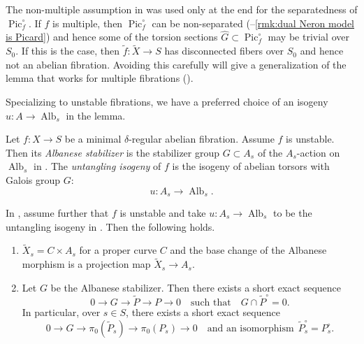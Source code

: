 \documentclass[reqno, letterpaper]{amsart}
\numberwithin{equation}{subsection}
\let\to\longrightarrow
\DeclareMathOperator{\Pic}{Pic}
\DeclareMathOperator{\Alb}{Alb}
\begin{document}
		\begin{remark} \label{rmk:untangle primitive}
			The non-multiple assumption in  was used only at the end for the separatedness of $\Pic^\circ_f$. If $f$ is multiple, then $\Pic^\circ_f$ can be non-separated (--\ref{rmk:dual Neron model is Picard}) and hence some of the torsion sections $\hat G \subset \Pic^\circ_f$ may be trivial over $S_0$. If this is the case, then $\tilde f : \tilde X \to S$ has disconnected fibers over $S_0$ and hence not an abelian fibration. Avoiding this carefully will give a generalization of the lemma that works for multiple fibrations ().
		\end{remark}
		
		Specializing to unstable fibrations, we have a preferred choice of an isogeny $u : A \to \Alb_s$ in the lemma.
		
		\begin{definition} \label{def:Albanese stabilizer}
			Let $f : X \to S$ be a minimal $\delta$-regular abelian fibration. Assume $f$ is unstable. Then its \emph{Albanese stabilizer} is the stabilizer group $G \subset A_s$ of the $A_s$-action on $\Alb_s$ in . The \emph{untangling isogeny} of $f$ is the isogeny of abelian torsors with Galois group $G$:
			\[ u : A_s \to \Alb_s .\]
		\end{definition}
		
		\begin{proposition} \label{prop:untangle for unstable}
			In , assume further that $f$ is unstable and take $u : A_s \to \Alb_s$ to be the untangling isogeny in . Then the following holds.
			\begin{enumerate}
				\item $\tilde X_s = C \times A_s$ for a proper curve $C$ and the base change of the Albanese morphism is a projection map $\tilde X_s \to A_s$.
				\item Let $G$ be the Albanese stabilizer. Then there exists a short exact sequence
				\[ 0 \to G \to \tilde P \to P \to 0 \quad\mbox{such that}\quad G \cap \tilde P^\circ = 0 .\]
				In particular, over $s \in S$, there exists a short exact sequence
				\[ 0 \to G \to \pi_0 (\tilde P_s) \to \pi_0 (P_s) \to 0 \quad\mbox{and an isomorphism} \ \ \tilde P^\circ_s = P^\circ_s .\]
			\end{enumerate}
		\end{proposition}
		
\end{document}
